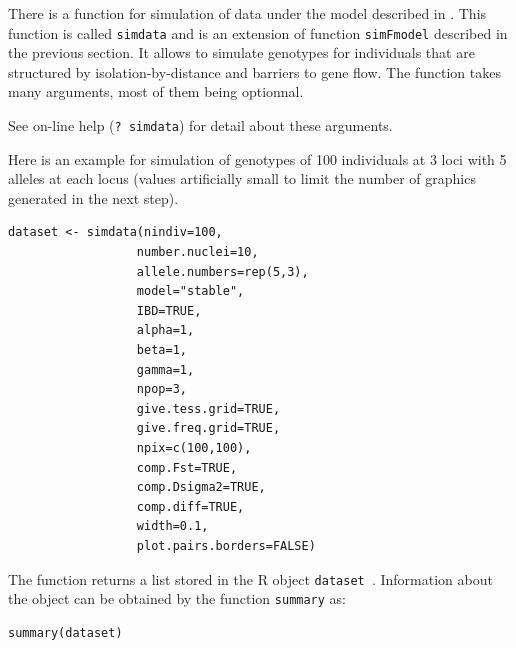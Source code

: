\documentclass[a4paper,10pt]{article}
\begin{document}
There is a function for simulation of data under the model described in \citep{Guillot09a}. 
This function is called {\tt simdata} and is an extension of function {\tt simFmodel} described in the previous section. It allows to simulate 
genotypes for individuals that are structured by isolation-by-distance and barriers to gene flow.
The function takes many arguments, most of them being optionnal. 


See on-line help ({\tt ? simdata}) for detail about these arguments.

Here is an example for simulation of genotypes of 100 individuals at 3 loci with 5 alleles at each locus 
(values artificially small to limit the number of graphics generated in the next step). 

\begin{verbatim}
dataset <- simdata(nindiv=100,
                  number.nuclei=10,
                  allele.numbers=rep(5,3),
                  model="stable",
                  IBD=TRUE,
                  alpha=1,
                  beta=1,
                  gamma=1,
                  npop=3,
                  give.tess.grid=TRUE,
                  give.freq.grid=TRUE,
                  npix=c(100,100),
                  comp.Fst=TRUE,
                  comp.Dsigma2=TRUE,
                  comp.diff=TRUE,
                  width=0.1,
                  plot.pairs.borders=FALSE)
\end{verbatim}





The function returns a list stored in the R object {\tt dataset }.
Information about the object can be obtained by the function {\tt summary} as:

\begin{verbatim}
summary(dataset)
\end{verbatim}
\end{document}
